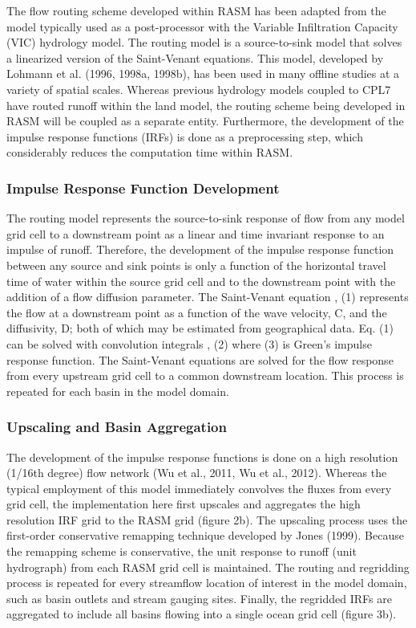 The flow routing scheme developed within RASM has been adapted from the model typically used as a post-processor with the Variable Infiltration Capacity (VIC) hydrology model. The routing model is a source-to-sink model that solves a linearized version of the Saint-Venant equations. This model, developed by Lohmann et al. (1996, 1998a, 1998b), has been used in many offline studies at a variety of spatial scales.  Whereas previous hydrology models coupled to CPL7 have routed runoff within the land model, the routing scheme being developed in RASM will be coupled as a separate entity. Furthermore, the development of the impulse response functions (IRFs) is done as a preprocessing step, which considerably reduces the computation time within RASM.

\subsubsection{Impulse Response Function Development}

The routing model represents the source-to-sink response of flow from any model grid cell to a downstream point as a linear and time invariant response to an impulse of runoff.  Therefore, the development of the impulse response function between any source and sink points is only a function of the horizontal travel time of water within the source grid cell and to the downstream point with the addition of a flow diffusion parameter.  The Saint-Venant equation
,							(1)
represents the flow at a downstream point as a function of the wave velocity, C, and the diffusivity, D; both of which may be estimated from geographical data.  Eq. (1) can be solved with convolution integrals
,						(2)	
where
						(3)
is Green’s impulse response function.  The Saint-Venant equations are solved for the flow response from every upstream grid cell to a common downstream location.  This process is repeated for each basin in the model domain.

\subsubsection{Upscaling and Basin Aggregation}

The development of the impulse response functions is done on a high resolution (1/16th degree) flow network (Wu et al., 2011, Wu et al., 2012).  Whereas the typical employment of this model immediately convolves the fluxes from every grid cell, the implementation here first upscales and aggregates the high resolution IRF grid to the RASM grid (figure 2b). The upscaling process uses the first-order conservative remapping technique developed by Jones (1999). Because the remapping scheme is conservative, the unit response to runoff (unit hydrograph) from each RASM grid cell is maintained. The routing and regridding process is repeated for every streamflow location of interest in the model domain, such as basin outlets and stream gauging sites.  Finally, the regridded IRFs are aggregated to include all basins flowing into a single ocean grid cell (figure 3b).

